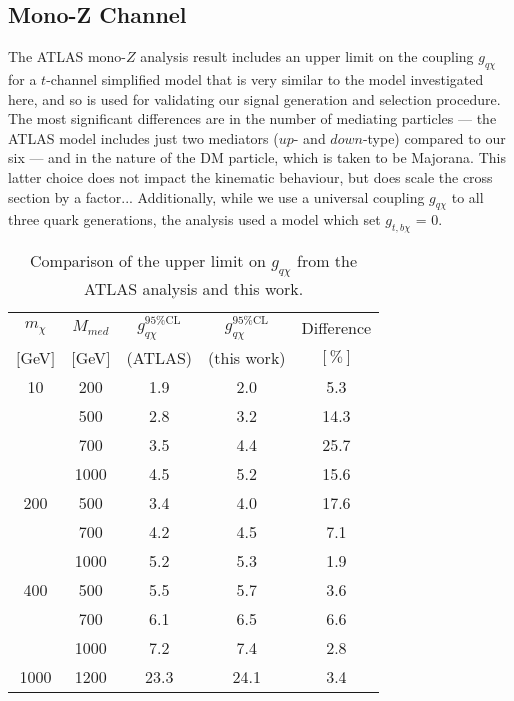 \subsection{Mono-Z Channel}
\label{monoZ_validation}


The ATLAS mono-$Z$ analysis result includes an upper limit on the coupling $g_{q \chi}$ for a $t$-channel simplified model that is very similar to the model investigated here, and so is used for validating our signal generation and selection procedure. The most significant differences are in the number of mediating particles --- the ATLAS model includes just two mediators ($up$- and $down$-type) compared to our six --- and in the nature of the DM particle, which is taken to be Majorana. This latter choice does not impact the kinematic behaviour, but does scale the cross section by a factor... Additionally, while we use a universal coupling $g_{q \chi}$ to all three quark generations, the analysis used a model which set $g_{t,b \chi}$ = 0.

\begin{table}
\begin{center}
\begin{tabular}{ c | c | c | c | c }
\hline
\hline
$m_{\chi}$ & $M_{med}$ & $g_{q \chi}^{95\%\mathrm{CL}}$ & $g_{q \chi}^{95\%\mathrm{CL}}$ & Difference \T \\
$[$GeV$]$ & $[$GeV$]$ & (ATLAS) & (this work) & $[\%]$ \B \\
\hline
10 & 200 & 1.9 & 2.0 & 5.3 \T \\
 & 500 & 2.8 & 3.2 & 14.3 \\
 & 700 & 3.5 & 4.4 & 25.7 \\
 & 1000 & 4.5 & 5.2 & 15.6 \\
200 & 500 & 3.4 & 4.0 & 17.6 \T \\
 & 700 & 4.2 & 4.5 & 7.1 \\
 & 1000 & 5.2 & 5.3 & 1.9 \\
400 & 500 & 5.5 & 5.7 & 3.6 \T \\
 & 700 & 6.1 & 6.5 & 6.6 \\
 & 1000 & 7.2 & 7.4 & 2.8 \\
1000 & 1200 & 23.3 & 24.1 & 3.4 \T \B \\
\hline
\hline
\end{tabular}
\end{center}
\caption{Comparison of the upper limit on $g_{q \chi}$ from the ATLAS analysis \cite{Aad:2014monoZlep} and this work.}
\label{tab:monoZvalidation}
\end{table} 

